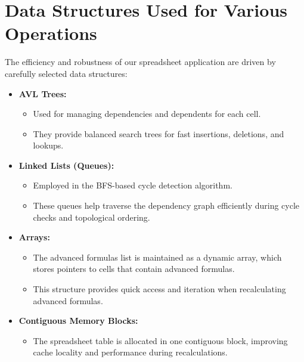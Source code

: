 \documentclass[12pt]{article}
\begin{document}
\section{Data Structures Used for Various Operations}
The efficiency and robustness of our spreadsheet application are driven by carefully selected data structures:
\begin{itemize}[noitemsep]
    \item \textbf{AVL Trees:}
    \begin{itemize}[noitemsep]
        \item Used for managing dependencies and dependents for each cell.
        \item They provide balanced search trees for fast insertions, deletions, and lookups.
    \end{itemize}
    \item \textbf{Linked Lists (Queues):}
    \begin{itemize}[noitemsep]
        \item Employed in the BFS-based cycle detection algorithm.
        \item These queues help traverse the dependency graph efficiently during cycle checks and topological ordering.
    \end{itemize}
    \item \textbf{Arrays:}
    \begin{itemize}[noitemsep]
        \item The advanced formulas list is maintained as a dynamic array, which stores pointers to cells that contain advanced formulas.
        \item This structure provides quick access and iteration when recalculating advanced formulas.
    \end{itemize}
    \item \textbf{Contiguous Memory Blocks:}
    \begin{itemize}[noitemsep]
        \item The spreadsheet table is allocated in one contiguous block, improving cache locality and performance during recalculations.
    \end{itemize}
\end{itemize}
\end{document}
